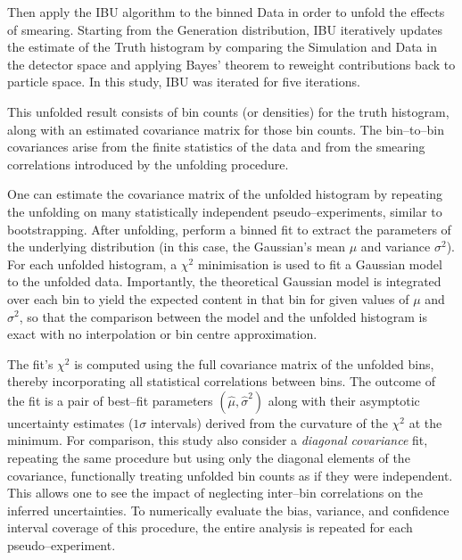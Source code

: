             Then apply the IBU algorithm to the binned Data in order to unfold the effects of smearing.
            Starting from the Generation distribution, IBU iteratively updates the estimate of the Truth histogram by comparing the Simulation and Data in the detector space and applying Bayes' theorem to reweight contributions back to particle space. 
            In this study, IBU was iterated for five iterations.
            
            This unfolded result consists of bin counts (or densities) for the truth histogram, along with an estimated covariance matrix for those bin counts.
            The bin--to--bin covariances arise from the finite statistics of the data and from the smearing correlations introduced by the unfolding procedure.
            
            One can estimate the covariance matrix of the unfolded histogram by repeating the unfolding on many statistically independent pseudo--experiments, similar to bootstrapping. 
            After unfolding, perform a binned fit to extract the parameters of the underlying distribution (in this case, the Gaussian’s mean $\mu$ and variance $\sigma^2$).
            For each unfolded histogram, a $\chi^2$ minimisation is used to fit a Gaussian model to the unfolded data.
            Importantly, the theoretical Gaussian model is integrated over each bin to yield the expected content in that bin for given values of $\mu$ and $\sigma^2$, so that the comparison between the model and the unfolded histogram is exact with no interpolation or bin centre approximation.
            
            The fit’s $\chi^2$ is computed using the full covariance matrix of the unfolded bins, thereby incorporating all statistical correlations between bins.
            The outcome of the fit is a pair of best--fit parameters $(\hat{\mu}, \hat{\sigma}^2)$ along with their asymptotic uncertainty estimates (\(1\sigma\) intervals) derived from the curvature of the $\chi^2$ at the minimum.
            For comparison, this study also consider a \emph{diagonal covariance} fit, repeating the same procedure but using only the diagonal elements of the covariance, functionally treating unfolded bin counts as if they were independent.
            This allows one to see the impact of neglecting inter--bin correlations on the inferred uncertainties.
            To numerically evaluate the bias, variance, and confidence interval coverage of this procedure, the entire analysis is repeated for each pseudo--experiment.
            
